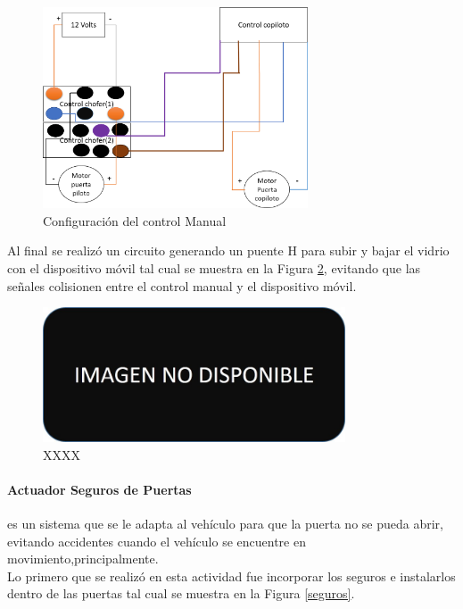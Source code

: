 \begin{figure}[H]
\centering
\includegraphics[width=0.7\textwidth]{metodologia/diagramacontrol.png}
\caption{Configuración del control Manual}
\label{control_manual}
\end{figure}

Al final se realizó un circuito generando un puente H para subir y bajar el vidrio con el dispositivo móvil tal cual se muestra en la Figura \ref{circuito_android}, evitando que las señales colisionen entre el control manual y el dispositivo móvil.

%
\begin{figure}[H]
\centering
\includegraphics[width=0.8\textwidth]{metodologia/nodisponible.jpg}
\caption{XXXX}
\label{circuito_android}
\end{figure}


\paragraph{Actuador Seguros de Puertas}
es un sistema que se le adapta al vehículo para que la puerta no se pueda abrir, evitando accidentes cuando el vehículo se encuentre en movimiento,principalmente.\\

Lo primero que se realizó en esta actividad fue incorporar los seguros e instalarlos dentro de las puertas tal cual se muestra en la Figura \ref{seguros}.

